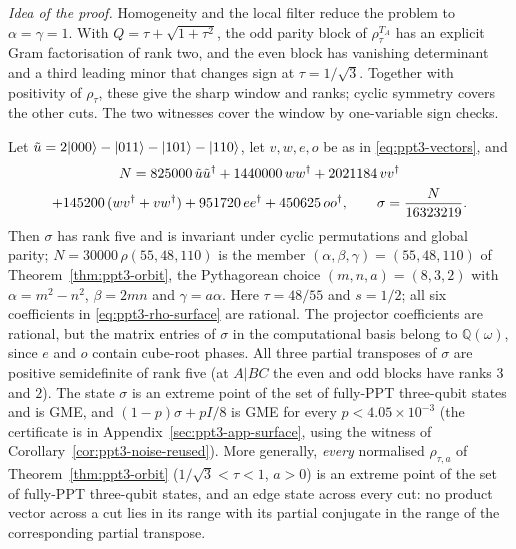 \emph{Idea of the proof.} Homogeneity and the local filter reduce the problem to $\alpha=\gamma=1$. With
$Q=\tau+\sqrt{1+\tau^2}$, the odd parity block of $\rho_\tau^{T_A}$ has an explicit Gram factorisation of rank two, and the even block
has vanishing determinant and a third leading minor that changes sign at $\tau=1/\sqrt3$. Together with positivity of
$\rho_\tau$, these give the sharp window and ranks; cyclic symmetry covers the other cuts. The two witnesses cover
the window by one-variable sign checks.

\begin{corollary}\label{cor:ppt3-extreme5}
Let $\tilde u=2\lvert000\rangle-\lvert011\rangle-\lvert101\rangle-\lvert110\rangle$, let $v,w,e,o$ be as in \eqref{eq:ppt3-vectors}, and
\begin{multline}\label{eq:ppt3-sigma5}
N=825000\,\tilde u\tilde u^{\dagger}+1440000\,ww^{\dagger}+2021184\,vv^{\dagger}\\
+145200\,(wv^{\dagger}+vw^{\dagger})+951720\,ee^{\dagger}+450625\,oo^{\dagger},
\qquad\sigma=\frac N{16323219}.
\end{multline}
Then $\sigma$ has rank five and is invariant under cyclic permutations and global parity; $N=30000\,\rho(55,48,110)$ is
the member $(\alpha,\beta,\gamma)=(55,48,110)$ of Theorem~\ref{thm:ppt3-orbit}, the Pythagorean choice $(m,n,a)=(8,3,2)$ with
$\alpha=m^2-n^2$, $\beta=2mn$ and $\gamma=a\alpha$.
Here $\tau=48/55$ and $s=1/2$; all six coefficients
in \eqref{eq:ppt3-rho-surface} are rational.
The projector coefficients are rational, but the matrix entries of $\sigma$ in the computational basis
belong to $\mathbb Q(\omega)$, since $e$ and $o$ contain cube-root phases.
All three partial transposes of $\sigma$ are positive semidefinite of rank five (at $A|BC$ the even and odd
blocks have ranks $3$ and $2$). The state $\sigma$ is an extreme point of the set of fully-PPT three-qubit states
and is GME, and $(1-p)\sigma+pI/8$ is GME for every $p<4.05\times10^{-3}$ (the certificate is in Appendix~\ref{sec:ppt3-app-surface}, using
the witness of Corollary~\ref{cor:ppt3-noise-reused}). More generally, \emph{every} normalised $\rho_{\tau,a}$ of Theorem~\ref{thm:ppt3-orbit}
($1/\sqrt3<\tau<1$, $a>0$) is an extreme point of the set of fully-PPT three-qubit states, and an edge state across every cut: no product
vector across a cut lies in its range with its partial conjugate in the range of the corresponding partial transpose.
\end{corollary}

